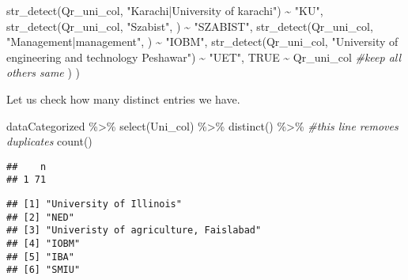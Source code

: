 \documentclass[
]{article}
\newenvironment{Shaded}{\begin{snugshade}}{\end{snugshade}}
\newcommand{\AttributeTok}[1]{\textcolor[rgb]{0.77,0.63,0.00}{#1}}
\newcommand{\CommentTok}[1]{\textcolor[rgb]{0.56,0.35,0.01}{\textit{#1}}}
\newcommand{\ConstantTok}[1]{\textcolor[rgb]{0.00,0.00,0.00}{#1}}
\newcommand{\FunctionTok}[1]{\textcolor[rgb]{0.00,0.00,0.00}{#1}}
\newcommand{\NormalTok}[1]{#1}
\newcommand{\SpecialCharTok}[1]{\textcolor[rgb]{0.00,0.00,0.00}{#1}}
\newcommand{\StringTok}[1]{\textcolor[rgb]{0.31,0.60,0.02}{#1}}
\begin{document}
\begin{Shaded}
\begin{Highlighting}[]
      \FunctionTok{str\_detect}\NormalTok{(Qr\_uni\_col, }\StringTok{"Karachi|University of karachi"}\NormalTok{) }\SpecialCharTok{\textasciitilde{}} \StringTok{"KU"}\NormalTok{,}
      \FunctionTok{str\_detect}\NormalTok{(Qr\_uni\_col, }\StringTok{"Szabist"}\NormalTok{, ) }\SpecialCharTok{\textasciitilde{}} \StringTok{"SZABIST"}\NormalTok{,}
      \FunctionTok{str\_detect}\NormalTok{(Qr\_uni\_col, }\StringTok{"Management|management"}\NormalTok{, ) }\SpecialCharTok{\textasciitilde{}} \StringTok{"IOBM"}\NormalTok{,}
      \FunctionTok{str\_detect}\NormalTok{(Qr\_uni\_col, }\StringTok{"University of engineering and technology Peshawar"}\NormalTok{) }\SpecialCharTok{\textasciitilde{}} \StringTok{"UET"}\NormalTok{,}
      \ConstantTok{TRUE} \SpecialCharTok{\textasciitilde{}}\NormalTok{ Qr\_uni\_col  }\CommentTok{\#keep all others same}
\NormalTok{    )}
\NormalTok{  )}
\end{Highlighting}
\end{Shaded}

Let us check how many distinct entries we have.

\begin{Shaded}
\begin{Highlighting}[]
\NormalTok{dataCategorized }\SpecialCharTok{\%\textgreater{}\%} 
  \FunctionTok{select}\NormalTok{(Uni\_col) }\SpecialCharTok{\%\textgreater{}\%}
  \FunctionTok{distinct}\NormalTok{() }\SpecialCharTok{\%\textgreater{}\%} \CommentTok{\#this line removes duplicates}
  \FunctionTok{count}\NormalTok{()}
\end{Highlighting}
\end{Shaded}

\begin{verbatim}
##    n
## 1 71
\end{verbatim}

\begin{Shaded}
\end{Shaded}

\begin{verbatim}
## [1] "University of Illinois"              
## [2] "NED"                                 
## [3] "Univeristy of agriculture, Faislabad"
## [4] "IOBM"                                
## [5] "IBA"                                 
## [6] "SMIU"
\end{verbatim}
\end{document}
